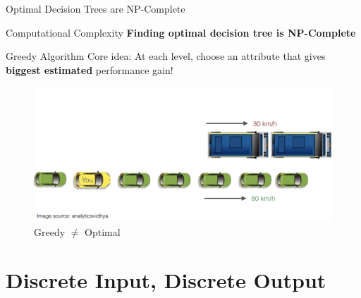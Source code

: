 \documentclass[usenames,dvipsnames]{beamer}
\begin{document}
\begin{frame}{Optimal Decision Trees are NP-Complete}
\begin{alertbox}{Computational Complexity}
\textbf{Finding optimal decision tree is NP-Complete}
\end{alertbox}

\end{frame}


\begin{frame}{Greedy Algorithm}
Core idea: At each level, choose an attribute that gives
\textbf{biggest estimated} performance gain!

\begin{figure}
	\centering
	\includegraphics[width=0.8\linewidth]{../assets/decision-trees/diagrams/gredy}
	\caption{Greedy $\neq$ Optimal}
	\label{fig:gredy}
\end{figure}
\end{frame}


\section{Discrete Input, Discrete Output}
\end{document}
